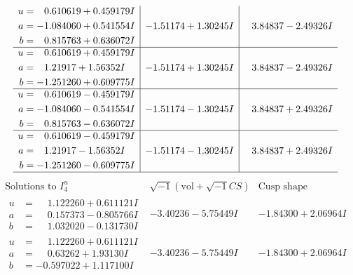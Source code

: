\documentclass[1p]{elsarticle_modified}
\theoremstyle{definition}
\newcommand{\I}{\sqrt{-1}}
\begin{document}
$$\begin{array}{c|c|c}
\begin{aligned}
u &= \phantom{-}0.610619 + 0.459179 I \\
a &= -1.084060 + 0.541554 I \\
b &= \phantom{-}0.815763 + 0.636072 I\end{aligned}
 & -1.51174 + 1.30245 I & \phantom{-}3.84837 - 2.49326 I \\ \hline\begin{aligned}
u &= \phantom{-}0.610619 + 0.459179 I \\
a &= \phantom{-}1.21917 + 1.56352 I \\
b &= -1.251260 + 0.609775 I\end{aligned}
 & -1.51174 + 1.30245 I & \phantom{-}3.84837 - 2.49326 I \\ \hline\begin{aligned}
u &= \phantom{-}0.610619 - 0.459179 I \\
a &= -1.084060 - 0.541554 I \\
b &= \phantom{-}0.815763 - 0.636072 I\end{aligned}
 & -1.51174 - 1.30245 I & \phantom{-}3.84837 + 2.49326 I \\ \hline\begin{aligned}
u &= \phantom{-}0.610619 - 0.459179 I \\
a &= \phantom{-}1.21917 - 1.56352 I \\
b &= -1.251260 - 0.609775 I\end{aligned}
 & -1.51174 - 1.30245 I & \phantom{-}3.84837 + 2.49326 I\\
 \hline 
 \end{array}$$\newpage$$\begin{array}{c|c|c}  
\text{Solutions to }I^u_{4}& \I (\text{vol} + \sqrt{-1}CS) & \text{Cusp shape}\\
 \hline 
\begin{aligned}
u &= \phantom{-}1.122260 + 0.611121 I \\
a &= \phantom{-}0.157373 - 0.805766 I \\
b &= \phantom{-}1.032020 - 0.131730 I\end{aligned}
 & -3.40236 - 5.75449 I & -1.84300 + 2.06964 I \\ \hline\begin{aligned}
u &= \phantom{-}1.122260 + 0.611121 I \\
a &= \phantom{-}0.63262 + 1.93130 I \\
b &= -0.597022 + 1.117100 I\end{aligned}
 & -3.40236 - 5.75449 I & -1.84300 + 2.06964 I \\ \hline\begin{aligned}

\end{aligned}
\end{array}$$
\end{document}

